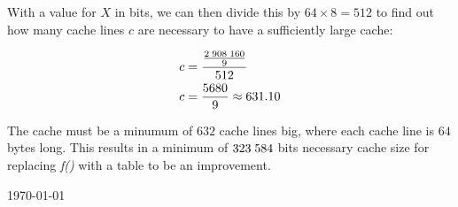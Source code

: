 \documentclass[fontsize=11pt, paper=a4, titlepage]{article}
\begin{document}
\begin{enumerate}[a)]
With a value for $X$ in bits, we can then divide this by $64\times 8 = 512$ to
find out how many cache lines $c$ are necessary to have a sufficiently large
cache:

    \begin{align*}
        c &= \frac{\frac{2\thickspace 908\thickspace 160}{9}}{512} \\
        c &= \frac{5680}{9} \approx 631.10
    \end{align*}

The cache must be a minumum of $632$ cache lines big, where each cache line is
$64$ bytes long. This results in a minimum of $323\thickspace 584$ bits
necessary cache size for replacing \textit{f()} with a table to be an
improvement.

\end{enumerate}

\vfill
\hfill \large{\today}
\end{document}
